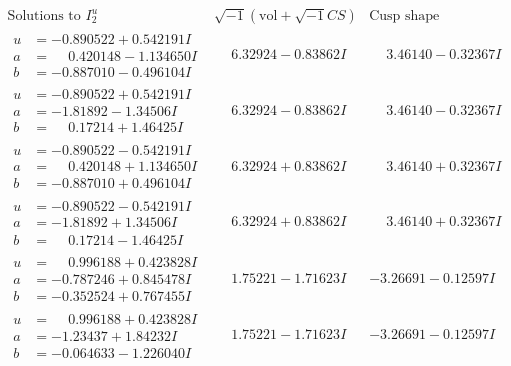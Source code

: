 \documentclass[1p]{elsarticle_modified}
\theoremstyle{definition}
\newcommand{\I}{\sqrt{-1}}
\begin{document}
$$\begin{array}{c|c|c}  
\text{Solutions to }I^u_{2}& \I (\text{vol} + \sqrt{-1}CS) & \text{Cusp shape}\\
 \hline 
\begin{aligned}
u &= -0.890522 + 0.542191 I \\
a &= \phantom{-}0.420148 - 1.134650 I \\
b &= -0.887010 - 0.496104 I\end{aligned}
 & \phantom{-}6.32924 - 0.83862 I & \phantom{-}3.46140 - 0.32367 I \\ \hline\begin{aligned}
u &= -0.890522 + 0.542191 I \\
a &= -1.81892 - 1.34506 I \\
b &= \phantom{-}0.17214 + 1.46425 I\end{aligned}
 & \phantom{-}6.32924 - 0.83862 I & \phantom{-}3.46140 - 0.32367 I \\ \hline\begin{aligned}
u &= -0.890522 - 0.542191 I \\
a &= \phantom{-}0.420148 + 1.134650 I \\
b &= -0.887010 + 0.496104 I\end{aligned}
 & \phantom{-}6.32924 + 0.83862 I & \phantom{-}3.46140 + 0.32367 I \\ \hline\begin{aligned}
u &= -0.890522 - 0.542191 I \\
a &= -1.81892 + 1.34506 I \\
b &= \phantom{-}0.17214 - 1.46425 I\end{aligned}
 & \phantom{-}6.32924 + 0.83862 I & \phantom{-}3.46140 + 0.32367 I \\ \hline\begin{aligned}
u &= \phantom{-}0.996188 + 0.423828 I \\
a &= -0.787246 + 0.845478 I \\
b &= -0.352524 + 0.767455 I\end{aligned}
 & \phantom{-}1.75221 - 1.71623 I & -3.26691 - 0.12597 I \\ \hline\begin{aligned}
u &= \phantom{-}0.996188 + 0.423828 I \\
a &= -1.23437 + 1.84232 I \\
b &= -0.064633 - 1.226040 I\end{aligned}
 & \phantom{-}1.75221 - 1.71623 I & -3.26691 - 0.12597 I \\ \hline\begin{aligned}

\end{aligned}
\end{array}$$
\end{document}
